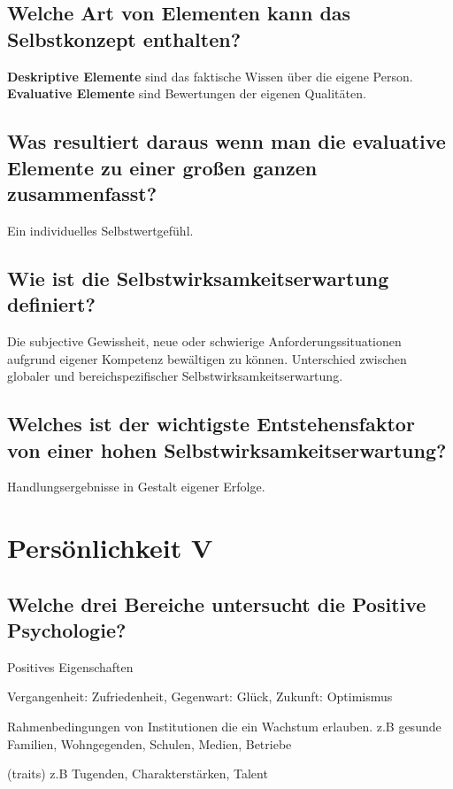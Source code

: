 \documentclass[a6paper,9pt,DIV=14]{scrartcl}
\begin{document}
\subsection{Welche Art von Elementen kann das Selbstkonzept enthalten?} %
\textbf{Deskriptive Elemente} sind das faktische Wissen über die eigene Person.\\
\textbf{Evaluative Elemente} sind Bewertungen der eigenen Qualitäten.
\subsection{Was resultiert daraus wenn man die evaluative Elemente zu einer großen ganzen zusammenfasst?}
Ein individuelles Selbstwertgefühl.
\subsection{Wie ist die Selbstwirksamkeitserwartung definiert?} %
Die subjective Gewissheit, neue oder schwierige Anforderungssituationen aufgrund eigener Kompetenz bewältigen zu können.
Unterschied zwischen globaler und bereichspezifischer Selbstwirksamkeitserwartung.
\subsection{Welches ist der wichtigste Entstehensfaktor von einer hohen Selbstwirksamkeitserwartung?} %
Handlungsergebnisse in Gestalt eigener Erfolge.


\section{Persönlichkeit V}
\subsection{Welche drei Bereiche untersucht die Positive Psychologie?} %
\begin{labeling}{Positives Eigenschaften}
\item [Positives Erleben] Vergangenheit: Zufriedenheit, Gegenwart: Glück, Zukunft: Optimismus
\item [Positive Institutionen] Rahmenbedingungen von Institutionen die ein Wachstum erlauben. z.B gesunde Familien, Wohngegenden, Schulen, Medien, Betriebe
\item [Positives Eigenschaften] (traits) z.B Tugenden, Charakterstärken, Talent
\end{labeling}
\end{document}
